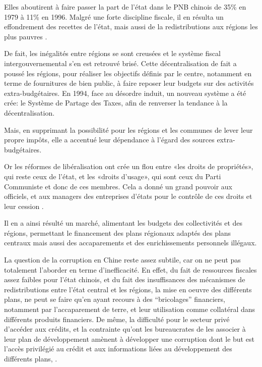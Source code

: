 \documentclass[a4paper]{article}
\begin{document}
 Elles aboutirent à faire passer la part de l’état dans le PNB chinois de 35\% en
1979 à 11\% en 1996. Malgré une forte discipline fiscale, il en résulta un
effondrement des recettes de l’état, mais aussi de la redistributions aux
régions les plus pauvres \cite{wong09_rebuil_gover_centur}.

 De fait, les inégalités entre régions se sont creusées et le système fiscal
intergouvernemental s’en est retrouvé brisé. Cette décentralisation de fait a
poussé les régions, pour réaliser les objectifs définis par le centre, notamment
en terme de fournitures de bien public, à faire reposer leur budgets sur des
activités extra-budgétaires. En 1994, face au désordre induit, un nouveau
système a été crée: le Système de Partage des Taxes, afin de renverser la
tendance à la décentralisation.

 Mais, en supprimant la possibilité pour les régions et les communes de lever
leur propre impôts, elle a accentué leur dépendance à l’égard des sources
extra-budgétaires. \cite{wong09_rebuil_gover_centur} 

Or les réformes de libéralisation ont crée un flou entre «les droits de
propriétés», qui reste ceux de l’état, et les «droits d’usage», qui sont ceux du
Parti Communiste et donc de ces membres. Cela a donné un grand pouvoir aux
officiels, et aux managers des entreprises d’états pour le contrôle de ces
droits et leur cession \cite{pei16_chinas}.

Il en a ainsi résulté un marché, alimentant les budgets des collectivités et des
régions, permettant le financement des plans régionaux adaptés des plans
centraux mais aussi des accaparements et des enrichissements personnels
illégaux.

La question de la corruption en Chine reste assez subtile, car on ne peut pas
totalement l’aborder en terme d’inefficacité. En effet, du fait de ressources
fiscales assez faibles pour l’état chinois, et du fait des insuffisances des
mécanismes de redistributions entre l’état central et les régions, la mise en
oeuvre des différents plans, ne peut se faire qu’en ayant recours à des
“bricolages” financiers, notamment par l’accaparement de terre, et leur
utilisation comme collatéral dans différents produits financiers. De même, la
difficulté pour le secteur privé d’accéder aux crédits, et la contrainte qu’ont
les bureaucrates de les associer à leur plan de développement amènent à
développer une corruption dont le but est l’accès privilégié au crédit et aux
informations liées au développement des différents plans, \cite{ang20_chinas}. 
\end{document}
